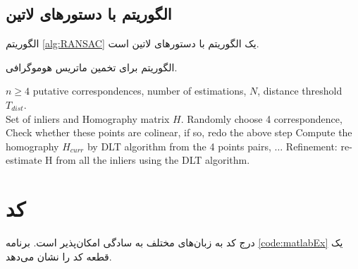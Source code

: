 \subsection{الگوریتم با دستورهای لاتین}
الگوریتم \ref{alg:RANSAC} یک الگوریتم با دستورهای لاتین است.

\begin{algorithm}[ht]
\onehalfspacing
\caption{الگوریتم  برای تخمین ماتریس هوموگرافی.} \label{alg:RANSAC}
\begin{latin}
\begin{algorithmic}[1]
\REQUIRE $n\geq4$ putative correspondences, number of estimations, $N$, distance threshold $T_{dist}$.\\
\ENSURE Set of inliers and Homography matrix $H$.
  \STATE Randomly choose 4 correspondence,
  \STATE Check whether these points are colinear, if so, redo the above step
  \STATE Compute the homography $H_{curr}$ by DLT algorithm from the 4 points pairs,
  \STATE $\ldots$ %
  \ENDFOR
  \STATE Refinement: re-estimate H from all the inliers using the DLT algorithm.
\end{algorithmic}
\end{latin}
\end{algorithm}

\section{کد}
درج کد به زبان‌های مختلف به سادگی امکان‌پذیر است. برنامه
\ref{code:matlabEx}
یک قطعه کد
را نشان می‌دهد.
\begin{figure}[ht]
	\begin{LTR}
        \singlespacing
		
	\end{LTR}
\end{figure}

